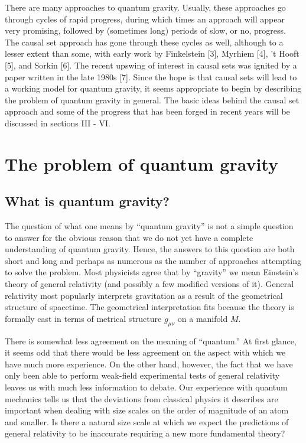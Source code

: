 There are many approaches to quantum gravity. Usually, these approaches go
through cycles of rapid progress, during which times an approach will appear
very promising, followed by (sometimes long) periods of slow, or no,
progress. The causal set approach has gone through these cycles as well,
although to a lesser extent than some, with early work by Finkelstein [3],
Myrhiem [4], 't Hooft [5], and Sorkin [6]. The recent upswing of interest in
causal sets was ignited by a paper written in the late 1980s [7]. Since the
hope is that causal sets will lead to a working model for quantum gravity,
it seems appropriate to begin by describing the problem of quantum gravity
in general. The basic ideas behind the causal set approach and some of the
progress that has been forged in recent years will be discussed in sections
III - VI.

\section{The problem of quantum gravity}

\subsection{What is quantum gravity?}

The question of what one means by ``quantum gravity'' is not a simple
question to answer for the obvious reason that we do not yet have a complete
understanding of quantum gravity. Hence, the answers to this question are
both short and long and perhaps as numerous as the number of approaches
attempting to solve the problem. Most physicists agree that by ``gravity''
we mean Einstein's theory of general relativity (and possibly a few modified
versions of it). General relativity most popularly interprets gravitation as
a result of the geometrical structure of spacetime. The geometrical
interpretation fits because the theory is formally cast in terms of metrical
structure $g_{\mu \nu }$ on a manifold $M$.

There is somewhat less agreement on the meaning of ``quantum.'' At first
glance, it seems odd that there would be less agreement on the aspect with
which we have much more experience. On the other hand, however, the fact
that we have only been able to perform weak-field experimental tests of
general relativity leaves us with much less information to debate. Our
experience with quantum mechanics tells us that the deviations from
classical physics it describes are important when dealing with size scales
on the order of magnitude of an atom and smaller. Is there a natural size
scale at which we expect the predictions of general relativity to be
inaccurate requiring a new more fundamental theory?

